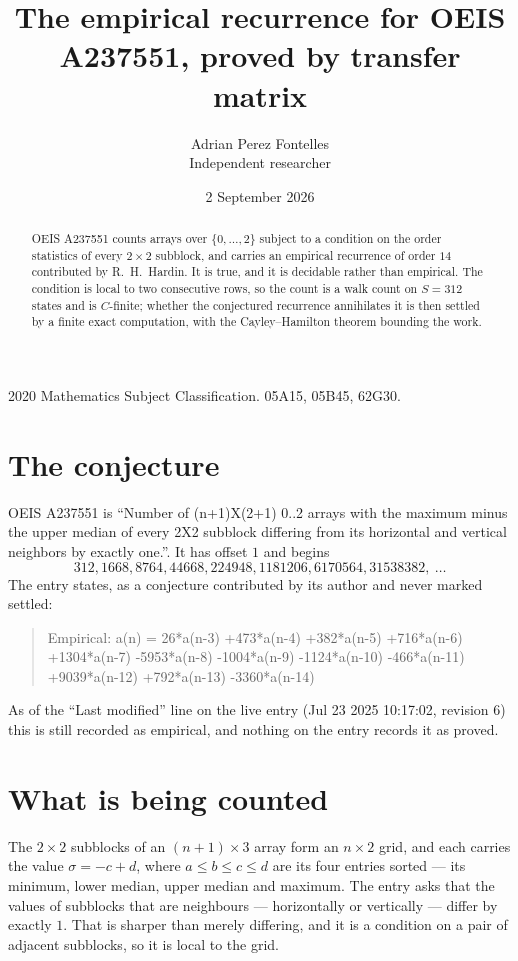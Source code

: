 \documentclass[11pt,a4paper]{article}
\title{The empirical recurrence for OEIS A237551, proved by transfer matrix}
\author{Adrian Perez Fontelles\\ \small Independent researcher}
\date{2 September 2026}
\theoremstyle{plain}
\theoremstyle{definition}
\begin{document}
\maketitle

\begin{abstract}
OEIS A237551 counts arrays over $\{0,\dots,2\}$ subject to a condition on the order
statistics of every $2\times2$ subblock, and carries an empirical recurrence of order
$14$ contributed by R.~H.~Hardin. It is true, and it is decidable rather than empirical.
The condition is local to two consecutive rows, so the count is a walk count on $S=312$
states and is $C$-finite; whether the conjectured recurrence annihilates it is then settled by
a finite exact computation, with the Cayley--Hamilton theorem bounding the work.
\end{abstract}

\noindent\small 2020 Mathematics Subject Classification. 05A15, 05B45, 62G30.\normalsize

\section{The conjecture}

OEIS A237551 is ``Number of (n+1)X(2+1) 0..2 arrays with the maximum minus the upper median of every 2X2 subblock differing from its horizontal and vertical neighbors by exactly one.''. It has offset $1$ and begins
\[
312, 1668, 8764, 44668, 224948, 1181206, 6170564, 31538382,\ \dots
\]
The entry states, as a conjecture contributed by its author and never marked settled:
\begin{quote}
Empirical: a(n) = 26*a(n-3) +473*a(n-4) +382*a(n-5) +716*a(n-6) +1304*a(n-7) -5953*a(n-8) -1004*a(n-9) -1124*a(n-10) -466*a(n-11) +9039*a(n-12) +792*a(n-13) -3360*a(n-14)
\end{quote}
As of the ``Last modified'' line on the live entry (Jul 23 2025 10:17:02, revision 6) this is still
recorded as empirical, and nothing on the entry records it as proved.

\section{What is being counted}

The $2\times2$ subblocks of an $(n+1)\times3$ array form an
$n\times2$ grid, and each carries the value $\sigma=-c+d$, where $a\le b\le c\le d$ are its four entries sorted --- its minimum, lower median, upper median and maximum. The entry asks that the values of
subblocks that are neighbours --- horizontally or vertically --- differ by exactly $1$.
That is sharper than merely differing, and it is a condition on a pair of adjacent subblocks,
so it is local to the grid.
\end{document}
